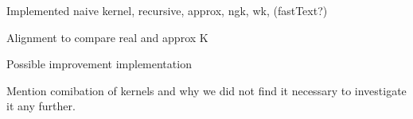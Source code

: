 Implemented naive kernel, recursive, approx, ngk, wk, (fastText?)

Alignment to compare real and approx K

Possible improvement implementation 

Mention comibation of kernels and why we did not find it necessary to investigate it any further. 

